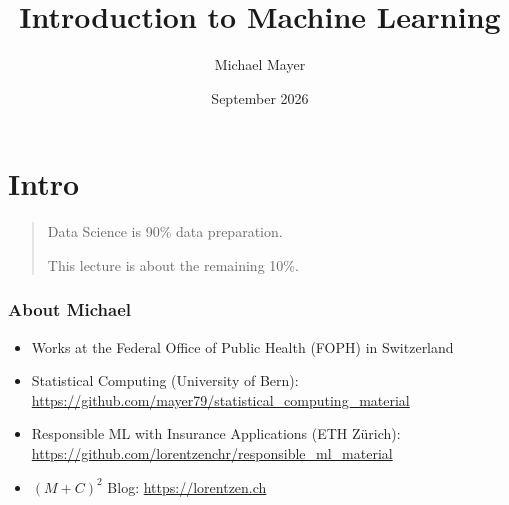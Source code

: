 \documentclass[
    utf8,
    aspectratio=169
]{beamer}  %
\title{Introduction to Machine Learning}
\author{Michael Mayer}
\date{September 2026}
\begin{document}

\frame{\titlepage}


\section{Intro}

\begin{frame}
\begin{quotation}
	\begin{huge}
		\begin{center}
			Data Science is 90\% data preparation.
	
			This lecture is about the remaining 10\%.
		\end{center}
	\end{huge}
\end{quotation}
\end{frame}

\begin{frame}
	\frametitle{About Michael}
	\begin{itemize}
		\item Works at the Federal Office of Public Health (FOPH) in Switzerland
		\item Statistical Computing (University of Bern): \url{https://github.com/mayer79/statistical_computing_material}
		\item Responsible ML with Insurance Applications (ETH Zürich): \url{https://github.com/lorentzenchr/responsible_ml_material}
		\item $(M+C)^2$ Blog: \url{https://lorentzen.ch}
	\end{itemize}
\end{frame}
\end{document}
